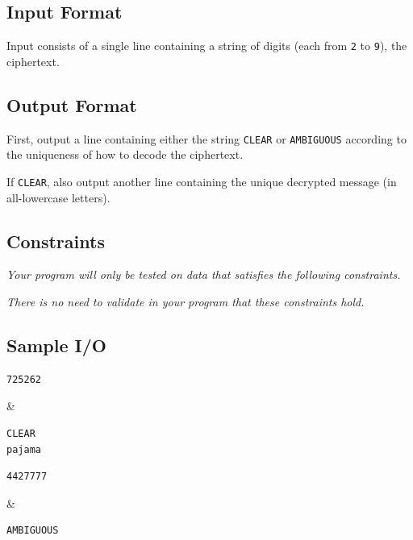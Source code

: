 \newpage

\subsection*{Input Format}

Input consists of a single line containing a string of digits (each from \texttt{2} to \texttt{9}), the ciphertext.

\subsection*{Output Format}

First, output a line containing either the string \texttt{CLEAR} or \texttt{AMBIGUOUS} according to the uniqueness of how to decode the ciphertext.

If \texttt{CLEAR}, also output another line containing the unique decrypted message (in all-lowercase letters).

\subsection*{Constraints}

\textit{Your program will only be tested on data that satisfies the following constraints.}


\textit{There is no need to validate in your program that these constraints hold.}

\subsection*{Sample I/O}

\begin{sampleIO}
\begin{verbatim}
725262
\end{verbatim}
&
\begin{verbatim}
CLEAR
pajama
\end{verbatim}
\end{sampleIO}

\begin{sampleIO}
\begin{verbatim}
4427777
\end{verbatim}
&
\begin{verbatim}
AMBIGUOUS
\end{verbatim}
\end{sampleIO}


